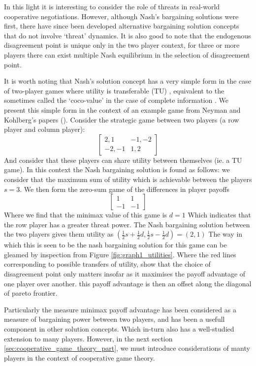 In this light it is interesting to consider the role of threats in real-world cooperative negotiations. However, although Nash's bargaining solutions were first, there have since been developed alternative bargaining solution concepts that do not involve `threat' dynamics. \cite{bozbay}
It is also good to note that the endogenous disagreement point is unique only in the two player context, for three or more players there can exist multiple Nash equilibrium in the selection of disagreement point.\cite{10.2307/43616981}

It is worth noting that Nash's solution concept has a very simple form in the case of two-player games where utility is transferable (TU) \cite{value2,shap_lectures,value1}, equivalent to the sometimes called the `coco-value' in the case of complete information \cite{kalai1,Kalai2010}.
We present this simple form in the context of an example game from Neyman and Kohlberg's papers (\cite{value2,value1}).
Consider the strategic game between two players (a row player and column player):
\begin{equation}\label{eq:example_game1} \begin{bmatrix}2,1 & -1,-2\\ -2,-1 & 1,2\end{bmatrix} \end{equation}
And consider that these players can share utility between themselves (ie. a TU game). In this context the Nash bargaining solution is found as follows:
we consider that the maximum sum of utility which is achievable between the players $s=3$.
We then form the zero-sum game of the differences in player payoffs
$$ \begin{bmatrix}1 & 1\\ -1 & -1\end{bmatrix} $$
Where we find that the minimax value of this game is $d=1$ Which indicates that the row player has a greater threat power.
The Nash bargaining solution between the two players gives them utility as $(\frac{1}{2}s+\frac{1}{2}d,\frac{1}{2}s-\frac{1}{2}d) = (2,1)$
The way in which this is seen to be the nash bargaining solution for this game can be gleamed by inspection from Figure \ref{fig:graph1_utilities}.
Where the red lines corresponding to possible transfers of utility, show that the choice of disagreement point only matters insofar as it maximises the payoff advantage of one player over another.
this payoff advantage is then an offset along the diagonal of pareto frontier.

Particularly the measure minimax payoff advantage has been considered as a measure of bargaining power between two players, and has been a usefull component in other solution concepts.
Which in-turn also has a well-studied extension to many players.\cite{values1,values2,values3}
However, in the next section \ref{sec:cooperative_game_theory_part}, we must introduce considerations of manty players in the context of cooperative game theory.

